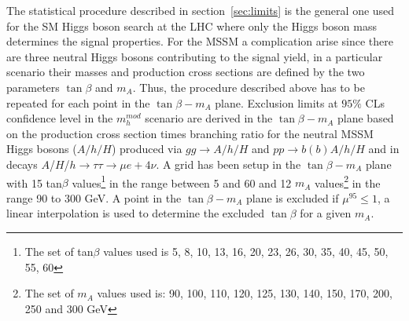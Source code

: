 The statistical procedure described in section~\ref{sec:limits} is  the general one used for the SM Higgs
boson search at the LHC where only the Higgs boson mass determines the signal properties. For the MSSM a complication
arise since  there are three neutral Higgs bosons contributing to the signal yield,
in a particular scenario their masses and production cross sections are defined 
by the two parameters $\tan \beta$ and $m_A$. Thus, the  procedure described above
 has to be repeated for each point in the $\tan \beta - m_A$ plane. 
Exclusion limits at $95\%$ CLs confidence level in the $m_h^{mod}$ scenario  
are derived in the $\tan \beta - m_A$ plane based on the production cross section times branching ratio for
the neutral MSSM Higgs bosons ($A/h/H$) produced via $gg\rightarrow A/h/H$ and $pp\rightarrow b(b)A/h/H$
 and in decays $A$/$H$/$h\to\tau\tau\to \mu e + 4\nu$. 
A grid has been setup in the $\tan \beta - m_A$ plane with 15 tan$\beta$ values\footnote{
			The set of  tan$\beta$ values used
			is 5, 8, 10, 13, 16, 20, 23, 26, 30, 35, 40, 45, 50, 55, 60}  
in the range between 5 and 60 and 12 $m_A$ values\footnote{ The set of $m_A$ values used is: 90, 100, 110, 120, 125, 130,
                        140, 150, 170, 200, 250 and 300 GeV}
in the range 90 to 300 GeV. A point in the  $\tan \beta - m_A$ plane is excluded if $\mu^{95} \leq 1$,
a linear interpolation is used to determine the excluded $\tan \beta$ for a given $m_A$.


